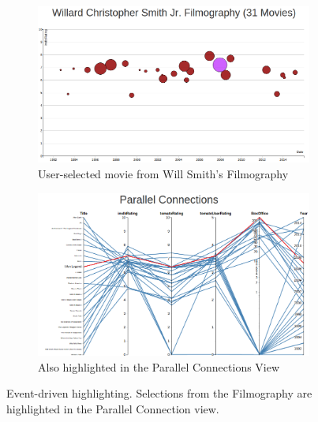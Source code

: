 \documentclass[12pt]{article}
\begin{document}
\begin{figure}[h!]
		\centering
		\begin{subfigure}[t]{.5\textwidth}
		  \centering
		  \includegraphics[width=\linewidth]{images/TimelineSelection.png}
		  \caption{User-selected movie from Will Smith's Filmography}
		  \label{fig:ftpha}
		\end{subfigure}%
		\begin{subfigure}[t]{.8\textwidth}
		  \centering
		  \includegraphics[width=.7\linewidth]{images/pacHighlight.png}
		  \caption{Also highlighted in the Parallel Connections View}
		  \label{fig:ftphb}
		\end{subfigure}%
		\caption{Event-driven highlighting.  Selections from the Filmography are highlighted in the Parallel Connection view.}
		\label{fig:filmToParallelHighlight}
	\end{figure}
\end{document}
